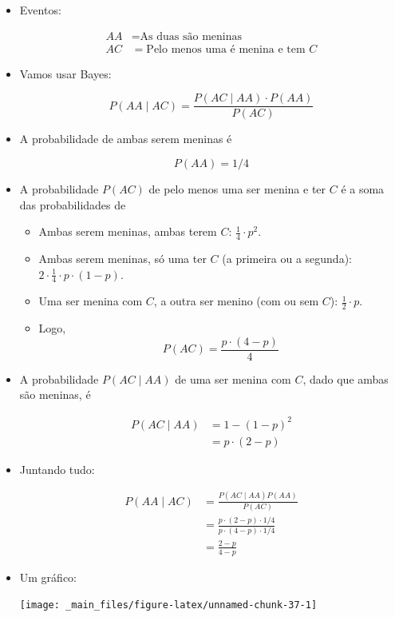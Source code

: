 \documentclass[
  11pt]{report}
\begin{document}
\begin{itemize}
\item
  Eventos:

  \[
  \begin{aligned}
  AA &= \text{As duas são meninas} \\
  AC &= \text{Pelo menos uma é menina e tem } C
  \end{aligned}
  \]
\item
  Vamos usar Bayes:

  \[
  P(AA \mid AC) = \frac{P(AC \mid AA) \cdot P(AA)}{P(AC)}
  \]
\item
  A probabilidade de ambas serem meninas é

  \[
  P(AA) = 1/4
  \]
\item
  A probabilidade $P(AC)$ de pelo menos uma ser menina e ter $C$ é a soma das probabilidades de

  \begin{itemize}
  \item
    Ambas serem meninas, ambas terem $C$: $\frac14 \cdot p^2$.
  \item
    Ambas serem meninas, só uma ter $C$ (a primeira ou a segunda): $2 \cdot \frac14 \cdot p \cdot (1 - p)$.
  \item
    Uma ser menina com $C$, a outra ser menino (com ou sem $C$): $\frac12 \cdot p$.
  \item
    Logo,
    \[
    P(AC) = \frac{p \cdot (4 - p)}{4}
    \]
  \end{itemize}
\item
  A probabilidade $P(AC \mid AA)$ de uma ser menina com $C$, dado que ambas são meninas, é

  \[
  \begin{aligned}
  P(AC \mid AA) &= 1 - (1 - p)^2 \\
  &= p \cdot (2 - p)
  \end{aligned}
  \]
\item
  Juntando tudo:

  \[
  \begin{aligned}
  P(AA \mid AC) 
  &= \frac{P(AC \mid AA) P(AA)}{P(AC)} \\
  &= \frac
    {p \cdot (2 - p) \cdot 1/4}
    {p \cdot (4 - p) \cdot 1/4} \\
  &= \frac{2 - p}{4 - p}
  \end{aligned}
  \]
\item
  Um gráfico:

  \begin{center}\texttt{[image: \_main\_files/figure-latex/unnamed-chunk-37-1]} \end{center}
\end{itemize}
\end{document}
